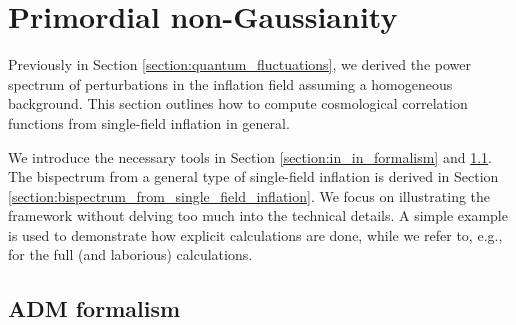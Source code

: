 \section{Primordial non-Gaussianity} \label{section:primordial_non_Gaussianity}

Previously in Section \ref{section:quantum_fluctuations}, we derived the power spectrum of perturbations in the inflation field assuming a homogeneous background. This section outlines how to compute cosmological correlation functions from single-field inflation in general.

We introduce the necessary tools in Section \ref{section:in_in_formalism} and \ref{section:ADM_formalism}. The bispectrum from a general type of single-field inflation is derived in Section \ref{section:bispectrum_from_single_field_inflation}. We focus on illustrating the framework without delving too much into the technical details. A simple example is used to demonstrate how explicit calculations are done, while we refer to, e.g., \cite{Maldacena2013,Chen2010review,Burrage2011large} for the full (and laborious) calculations.

\subsection{ADM formalism} \label{section:ADM_formalism}

